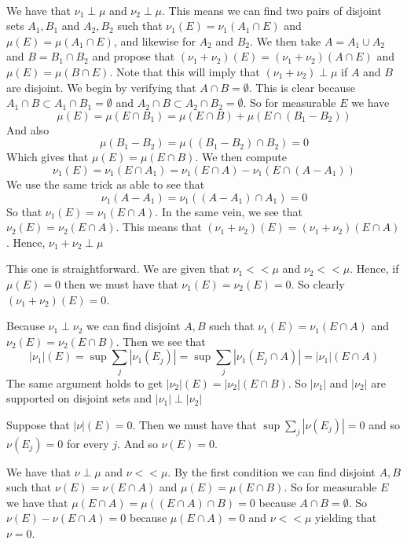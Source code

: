 \documentclass{article}
\newcommand{\problem}[1]{\noindent{\textbf{Problem #1}}\\}
\newcommand{\problempart}[1]{\noindent{\textbf{(#1)}}}
\begin{document}
\problem{6.7.10}
\problempart{a} We have that $\nu_1 \perp \mu$ and $\nu_2 \perp \mu$. This means we can find two pairs of disjoint sets $A_1, B_1$ and $A_2, B_2$ such that $\nu_1(E) = \nu_1(A_1 \cap E)$ and $\mu(E) = \mu(A_1 \cap E)$, and likewise for $A_2$ and $B_2$. We then take $A = A_1\cup A_2$ and $B = B_1 \cap B_2$ and propose that $(\nu_1 + \nu_2)(E) = (\nu_1 + \nu_2)(A \cap E)$ and $\mu(E) = \mu(B \cap E)$. Note that this will imply that $(\nu_1 + \nu_2) \perp \mu$ if $A$ and $B$ are disjoint. We begin by verifying that $A \cap B = \emptyset$. This is clear because $A_1 \cap B \subset A_1 \cap B_1 = \emptyset$ and $A_2 \cap B \subset A_2 \cap B_2 = \emptyset$. So for measurable $E$ we have
\[
\mu(E) = \mu(E \cap B_1) = \mu(E\cap B) + \mu(E \cap (B_1 - B_2)) 
\]
And also
\[
\mu(B_1 - B_2) = \mu((B_1 - B_2) \cap B_2) = 0
\]
Which gives that $\mu(E) = \mu(E \cap B)$. We then compute
\[
\nu_1(E) = \nu_1(E \cap A_1) = \nu_1(E \cap A) - \nu_1(E \cap (A - A_1)) 
\]
We use the same trick as able to see that
\[
\nu_1(A - A_1) = \nu_1((A - A_1) \cap A_1) = 0
\] 
So that $\nu_1(E) = \nu_1(E \cap A)$. In the same vein, we see that $\nu_2(E) = \nu_2(E \cap A)$. This means that $(\nu_1 + \nu_2)(E) = (\nu_1 + \nu_2)(E\cap A)$. Hence, $\nu_1 + \nu_2 \perp \mu$

\problempart{b} This one is straightforward. We are given that $\nu_1 << \mu$ and $\nu_2 << \mu$. Hence, if $\mu(E) = 0$ then we must have that $\nu_1(E) = \nu_2(E) = 0$. So clearly $(\nu_1 + \nu_2)(E) = 0$.

\problempart{c} Because $\nu_1 \perp \nu_2$ we can find disjoint $A,B$ such that $\nu_1(E) = \nu_1(E \cap A)$ and $\nu_2(E) = \nu_2(E \cap B)$. Then we see that
\[
|\nu_1|(E) = \sup \sum_{j} |\nu_1(E_j)| = \sup \sum_j |\nu_1(E_j \cap A)| = |\nu_1|(E\cap A)
\]
The same argument holds to get $|\nu_2|(E) = |\nu_2|(E\cap B)$. So $|\nu_1|$ and $|\nu_2|$ are supported on disjoint sets and $|\nu_1|\perp|\nu_2|$

\problempart{d} Suppose that $|\nu|(E) = 0$. Then we must have that $\sup \sum_j |\nu(E_j)| = 0$ and so $\nu(E_j) = 0$ for every $j$. And so $\nu(E) = 0$. 

\problempart{e} We have that $\nu \perp \mu$ and $\nu << \mu$. By the first condition we can find disjoint $A,B$ such that $\nu(E) = \nu(E\cap A)$ and $\mu(E) = \mu(E\cap B)$. So for measurable $E$ we have that $\mu(E\cap A) = \mu((E\cap A) \cap B) = 0$ because $A \cap B = \emptyset$. So $\nu(E) - \nu(E\cap A) = 0$ because $\mu(E\cap A) = 0$ and $\nu << \mu$ yielding that $\nu = 0$.  
\end{document}
